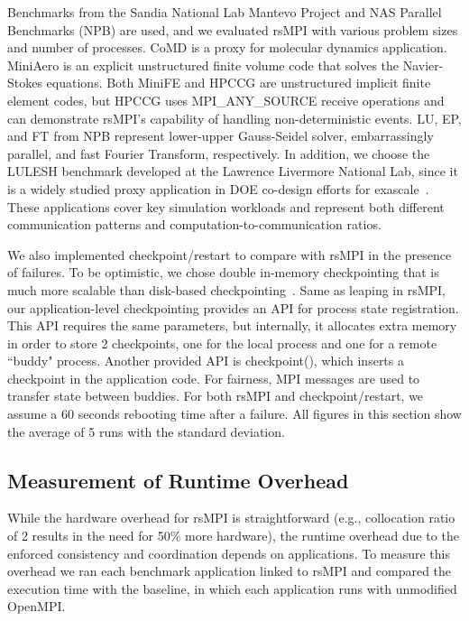 Benchmarks from the Sandia National Lab Mantevo Project and NAS Parallel Benchmarks (NPB) are used, and we evaluated rsMPI with various problem sizes and number of processes. 
CoMD is a proxy for molecular dynamics application. MiniAero is an explicit unstructured finite volume code that solves the Navier-Stokes equations. Both MiniFE and HPCCG are unstructured implicit finite element codes, but HPCCG uses MPI\_ANY\_SOURCE receive operations and can demonstrate rsMPI's capability of handling non-deterministic events. LU, EP, and FT from NPB represent lower-upper Gauss-Seidel solver, embarrassingly parallel, and fast Fourier Transform, respectively. In addition, we choose the LULESH benchmark developed at the Lawrence Livermore National Lab, since it is a widely studied proxy application in DOE co-design efforts for exascale~\cite{LULESH2:changes}. These applications cover key simulation workloads and represent both different communication patterns and computation-to-communication ratios.

We also implemented checkpoint/restart to compare with rsMPI in the presence of failures. 
To be optimistic, we chose double in-memory checkpointing that is much more scalable than disk-based checkpointing~\cite{zheng_2004_ftccharm}. 
Same as leaping in rsMPI, our application-level checkpointing provides an API for process state registration. This API requires the same parameters, but internally, it allocates extra memory in order to store 2 checkpoints, one for the local process and one for a remote ``buddy" process. Another provided API is checkpoint(), which inserts a checkpoint in the application code. For fairness, MPI messages are used to transfer state between buddies.  
For both rsMPI and checkpoint/restart, we assume a 60 seconds rebooting time after a failure. All figures in this section show the average of 5 runs with the standard deviation.

\subsection{Measurement of Runtime Overhead}
\label{sec:runtime_overhead}
While the hardware overhead for rsMPI is straightforward (e.g., collocation ratio of 2 results in the need for 50\% more hardware), 
the runtime overhead due to the enforced consistency and coordination depends on applications. To measure this overhead we ran each benchmark application linked to rsMPI and compared the execution time with the baseline, in which each application runs with unmodified OpenMPI.

